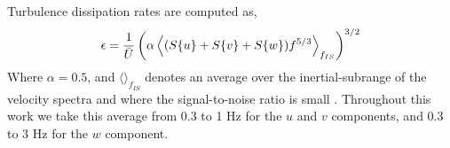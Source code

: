 Turbulence dissipation rates are computed as,
\begin{align}
  \epsilon = \frac{1}{\bar{U}}\left(\alpha\left\langle(S\{u\}+S\{v\}+S\{w\})f^{5/3}\right\rangle_{f_{IS}}\right)^{3/2}
\end{align}
Where  $\alpha=0.5$, and $\langle\rangle_{f_{IS}}$ denotes an average over the inertial-subrange of the velocity spectra and where the signal-to-noise ratio is small \cite[]{Lumley+Terray1983,Sreenivasan1995}. Throughout this work we take this average from 0.3 to 1 Hz for the $u$ and $v$ components, and 0.3 to 3 Hz for the $w$ component.

